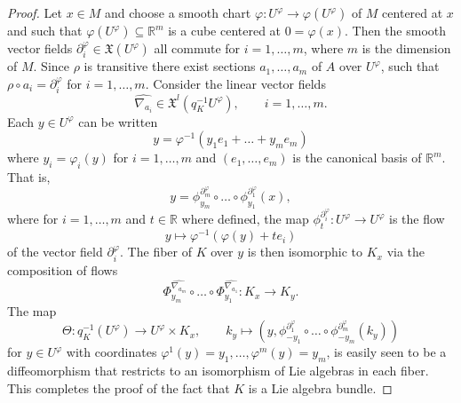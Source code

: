 \documentclass{amsart}
\theoremstyle{plain}
\newcommand{\R}{\mathbb{R}}
\newcommand{\inv}{^{-1}}
\newcommand{\mx}{\mathfrak{X}}
\begin{document}
\begin{proof}
Let $x\in M$ and choose a smooth chart $\varphi\colon U^\varphi\to \varphi(U^\varphi)$ of $M$ centered at $x$ and such that $\varphi(U^\varphi)\subseteq \R^m$ is a cube centered at $0=\varphi(x)$. Then the smooth vector fields $\partial_i^\varphi\in \mx(U^\varphi)$ all commute for $i=1,\ldots, m$, where $m$ is the dimension of $M$. Since $\rho$ is transitive there exist sections $a_1,\ldots, a_m$ of $A$ over $U^\varphi$, such that $\rho\circ a_i=\partial_i^\varphi$ for $i=1,\ldots,m$. Consider the linear vector fields
\[ \widehat{\nabla_{a_i}}\in\mx^l\left(q_K\inv U^\varphi\right), \qquad i=1,\ldots,m.
\]
Each $y\in U^\varphi$ can be written 
\[ y=\varphi\inv(y_1e_1+\ldots+y_me_m)
\]
where $y_i=\varphi_i(y)$ for $i=1,\ldots,m$ and $(e_1,\ldots, e_m)$ is the canonical basis of $\R^m$.
That is, 
\[y=\phi^{\partial_{m}^\varphi}_{y_m}\circ \ldots \circ \phi^{\partial_{1}^\varphi}_{y_1}(x),
\]
where for $i=1,\ldots,m$ and $t\in\R$ where defined, the map $\phi^{\partial_{i}^\varphi}_{t}\colon U^\varphi\to U^\varphi$ is the flow 
\[ y\mapsto \varphi\inv(\varphi(y)+te_i)
\]
of the vector field $\partial_i^\varphi$.
The fiber of $K$ over $y$ is then isomorphic to $K_x$ via the composition of flows
\[ \Phi^{\widehat{\nabla_{a_m}}}_{y_m}\circ \ldots \circ \Phi^{\widehat{\nabla_{a_1}}}_{y_1}\colon K_x\to K_y.
\]
The map
\[ \Theta\colon q_K\inv(U^\varphi)\to U^\varphi\times K_x, \qquad k_y\mapsto \left(y,\phi^{\partial_{1}^\varphi}_{-y_1}\circ \ldots \circ \phi^{\partial_{m}^\varphi}_{-y_m}(k_y)\right)
\]
for $y\in U^\varphi$ with coordinates $\varphi^1(y)=y_1, \ldots, \varphi^m(y)=y_m$, is easily seen to be a diffeomorphism 
that restricts to an isomorphism of Lie algebras in each fiber. This completes the proof of the fact that $K$ is a Lie algebra bundle.
\end{proof}
\end{document}
